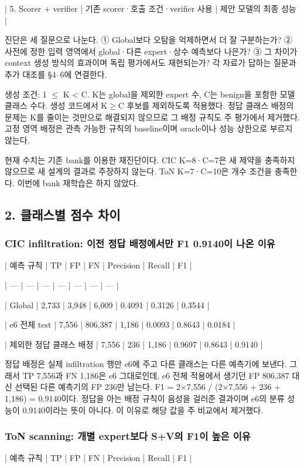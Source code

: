 | 5. Scorer +\allowbreak{} verifier | 기존 scorer·호출 조건·verifier 사용 | 제안 모델의 최종 성능 |

진단은 세 질문으로 나눈다. ① Global보다 오탐을 억제하면서 더 잘 구분하는가? ② 사전에 정한 입력 영역에서 global·다른 expert·상수 예측보다 나은가? ③ 그 차이가 context 생성 방식의 효과이며 독립 평가에서도 재현되는가? 각 자료가 답하는 질문과 추가 대조를 §4–6에 연결한다.

생성 조건: 1 \ensuremath{\leq} K < C. K는 global을 제외한 expert 수, C는 benign을 포함한 모델 클래스 수다. 생성 코드에서 K\ensuremath{\geq}C 후보를 제외하도록 적용했다. 정답 클래스 배정의 문제는 K를 줄이는 것만으로 해결되지 않으므로 그 배정 규칙도 주 평가에서 제거했다. 고정 영역 배정은 관측 가능한 규칙의 baseline이며 oracle이나 성능 상한으로 부르지 않는다.

현재 수치는 기존 bank를 이용한 재진단이다. CIC K=\allowbreak{}8·C=\allowbreak{}7은 새 제약을 충족하지 않으므로 새 설계의 결과로 주장하지 않는다. ToN K=\allowbreak{}7·C=\allowbreak{}10은 개수 조건을 충족한다. 이번에 bank 재학습은 하지 않았다.

\subsection{2. 클래스별 점수 차이}
\subsubsection{CIC infiltration: 이전 정답 배정에서만 F1 0.9140이 나온 이유}
| 예측 규칙 | TP | FP | FN | Precision | Recall | F1 |

| --- | --- | --- | --- | --- | --- | --- |

| Global | 2,733 | 3,948 | 6,009 | 0.4091 | 0.3126 | 0.3544 |

| e6 전체 test | 7,556 | 806,387 | 1,186 | 0.0093 | 0.8643 | 0.0184 |

| 제외한 정답 클래스 배정 | 7,556 | 236 | 1,186 | 0.9697 | 0.8643 | 0.9140 |

정답 배정은 실제 infiltration 행만 e6에 주고 다른 클래스는 다른 예측기에 보낸다. 그래서 TP 7,556과 FN 1,186은 e6 그대로인데, e6 전체 적용에서 생기던 FP 806,387 대신 선택된 다른 예측기의 FP 236만 남는다. F1 =\allowbreak{} 2×7,556 /\allowbreak{} (2×7,556 +\allowbreak{} 236 +\allowbreak{} 1,186) =\allowbreak{} 0.9140이다. 정답을 아는 배정 규칙이 음성을 걸러준 결과이며 e6의 분류 성능이 0.9140이라는 뜻이 아니다. 이 이유로 해당 값을 주 비교에서 제거했다.

\subsubsection{ToN scanning: 개별 expert보다 S+\allowbreak{}V의 F1이 높은 이유}
| 예측 규칙 | TP | FP | FN | Precision | Recall | F1 |


